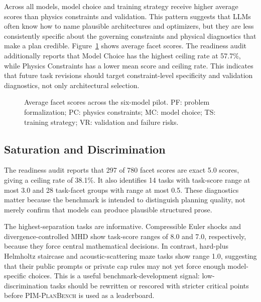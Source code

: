 \documentclass[11pt]{article}
\newcommand{\pimplanbench}{\textsc{PIM-PlanBench}}
\begin{document}
Across all models, model choice and training strategy receive higher average scores than physics constraints and validation. This pattern suggests that LLMs often know how to name plausible architectures and optimizers, but they are less consistently specific about the governing constraints and physical diagnostics that make a plan credible. Figure~\ref{fig:facet-bars} shows average facet scores. The readiness audit additionally reports that Model Choice has the highest ceiling rate at 57.7\%, while Physics Constraints has a lower mean score and ceiling rate. This indicates that future task revisions should target constraint-level specificity and validation diagnostics, not only architectural selection.

\begin{figure}[t]
\centering
{}
\caption{Average facet scores across the six-model pilot. PF: problem formalization; PC: physics constraints; MC: model choice; TS: training strategy; VR: validation and failure risks.}
\label{fig:facet-bars}
\end{figure}

\subsection{Saturation and Discrimination}

The readiness audit reports that 297 of 780 facet scores are exact 5.0 scores, giving a ceiling rate of 38.1\%. It also identifies 14 tasks with task-score range at most 3.0 and 28 task-facet groups with range at most 0.5. These diagnostics matter because the benchmark is intended to distinguish planning quality, not merely confirm that models can produce plausible structured prose.

The highest-separation tasks are informative. Compressible Euler shocks and divergence-controlled MHD show task-score ranges of 8.0 and 7.0, respectively, because they force central mathematical decisions. In contrast, hard-plus Helmholtz staircase and acoustic-scattering maze tasks show range 1.0, suggesting that their public prompts or private cap rules may not yet force enough model-specific choices. This is a useful benchmark-development signal: low-discrimination tasks should be rewritten or rescored with stricter critical points before \pimplanbench{} is used as a leaderboard.
\end{document}

